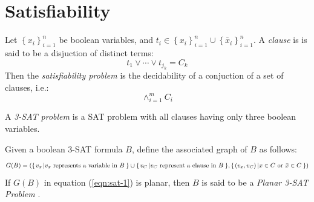 \section{Satisfiability}
\begin{prob}\label{prob:Satisfiability-1}%
Let $\left\lbrace x_i \right\rbrace_{i=1}^{n} $ be boolean variables, and $t_i \in \left\lbrace 
x_i\right\rbrace_{i=1}^{n}  \cup \left\lbrace \bar{x}_i\right\rbrace_{i=1}^{n}   $.  A 
\textit{clause} is is said to be a disjuction of distinct terms:
$$
t_1 \vee \cdots \vee t_{j_k} = C_k
$$
Then the \textit{satisfiability problem} is the decidability of a conjuction of a set of clauses, 
i.e.:
$$ \wedge_{i=1}^m C_i$$
\end{prob} \cite{skiena2009algorithm}
A \textit{3-SAT problem} is a SAT problem with all clauses having only three boolean variables. 
\begin{definition}\label{def:Satisfiability-2}
Given a boolean 3-SAT formula $B$, define the associated graph of $B$ as follows:  
\begin{equation}\label{eqn:sat-1}
G(B) = \left({\left\lbrace \left. v_x \left\vert v_x\text{ represents a variable in }B \right.\right.\right\rbrace } \cup {\left\lbrace \left. v_C \left\vert v_C\text{ represent a 
clause in }B \right.\right.\right\rbrace }  , {\left\lbrace \left. \left( v_x, v_C\right)  \left\vert x \in C \text{ or } \bar{x} \in C \right.\right.\right\rbrace }  \right) 
\end{equation} 
If $G(B)$ in equation (\ref{eqn:sat-1}) is planar, then $B$ is said to be a \textit{Planar 3-SAT 
Problem} \cite{mulzer2008minimum}.
\end{definition} 
